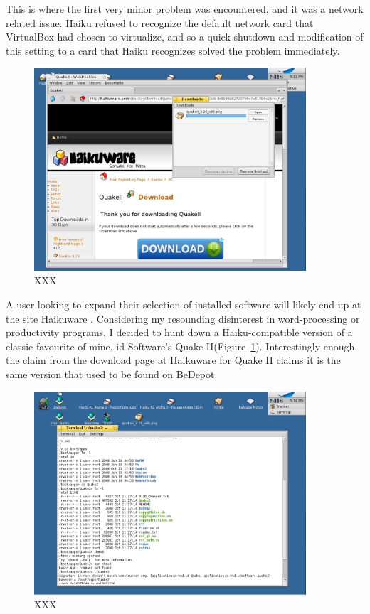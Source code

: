 \documentclass{article}
\newcommand{\figref}[1]{Figure~\ref{fig:#1}}
\begin{document}
This is where the first very minor problem was encountered, and it was
a network related issue.  Haiku refused to recognize the default
network card that VirtualBox had chosen to virtualize, and so a quick
shutdown and modification of this setting to a card that Haiku
recognizes solved the problem immediately.
	
\begin{figure}[h]
\centering
\includegraphics[width=0.9\textwidth]{figs/using-quake-download.png}
\caption{XXX}
\label{fig:using-quake-download}
\end{figure}

A user looking to expand their selection of installed software will
likely end up at the site Haikuware \cite{HaikuWare}.  Considering my
resounding disinterest in word-processing or productivity programs, I
decided to hunt down a Haiku-compatible version of a classic favourite
of mine, id Software’s Quake II(\figref{using-quake-download}).
Interestingly enough, the claim from the download page at Haikuware
for Quake II claims it is the same version that used to be found on
BeDepot.
	
\begin{figure}[h]
\centering
\includegraphics[width=0.9\textwidth]{figs/using-terminal.png}
\caption{XXX}
\label{fig:using-terminal}
\end{figure}
\end{document}
